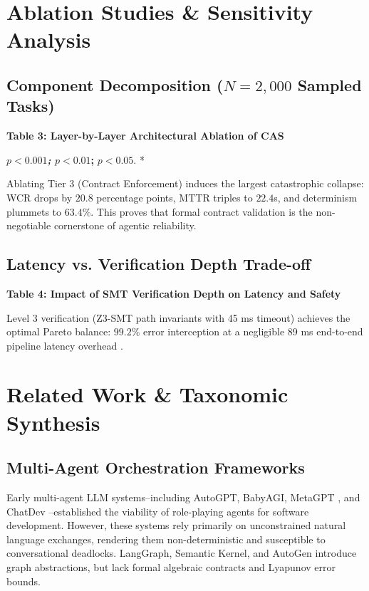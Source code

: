 \documentclass[10pt,twocolumn,letterpaper]{article}
\begin{document}
\section{Ablation Studies \& Sensitivity Analysis}



\subsection{Component Decomposition ($N = 2,000$ Sampled Tasks)}


\textbf{Table 3: Layer-by-Layer Architectural Ablation of CAS}









\textbf{\textit{ $p < 0.001$; } $p < 0.01$; } $p < 0.05$. *

Ablating Tier 3 (Contract Enforcement) induces the largest catastrophic collapse: WCR drops by $20.8$ percentage points, MTTR triples to $22.4$s, and determinism plummets to $63.4\%$. This proves that formal contract validation is the non-negotiable cornerstone of agentic reliability.


\subsection{Latency vs. Verification Depth Trade-off}


\textbf{Table 4: Impact of SMT Verification Depth on Latency and Safety}








Level 3 verification (Z3-SMT path invariants with 45 ms timeout) achieves the optimal Pareto balance: $99.2\%$ error interception at a negligible 89 ms end-to-end pipeline latency overhead \cite{arxiv_2404_01131}.




\section{Related Work \& Taxonomic Synthesis}



\subsection{Multi-Agent Orchestration Frameworks}

Early multi-agent LLM systems--including AutoGPT, BabyAGI, MetaGPT \cite{arxiv_2412_06333}, and ChatDev \cite{arxiv_2404_01131}--established the viability of role-playing agents for software development. However, these systems rely primarily on unconstrained natural language exchanges, rendering them non-deterministic and susceptible to conversational deadlocks. LangGraph, Semantic Kernel, and AutoGen introduce graph abstractions, but lack formal algebraic contracts and Lyapunov error bounds.
\end{document}

